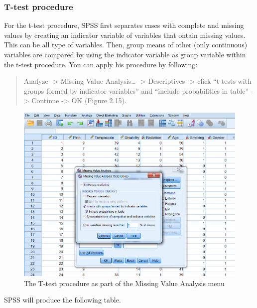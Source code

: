 \documentclass[]{book}
\begin{document}
\subsubsection{T-test procedure}\label{t-test-procedure}

For the t-test procedure, SPSS first separates cases with complete and
missing values by creating an indicator variable of variables that
ontain missing values. This can be all type of variables. Then, group
means of other (only continuous) variables are compared by using the
indicator variable as group variable within the t-test procedure. You
can apply his procedure by following:

\begin{quote}
Analyze -\textgreater{} Missing Value Analysis\ldots{} -\textgreater{}
Descriptives -\textgreater{} click ``t-tests with groups formed by
indicator variables'' and ``include probabilities in table''
-\textgreater{} Continue -\textgreater{} OK (Figure 2.15).
\end{quote}

\begin{figure}

{\centering \includegraphics[width=0.9\linewidth]{images/fig2.11} 

}

\caption{The T-test procedure as part of the Missing Value Analysis menu}\label{fig:fig2-11}
\end{figure}

SPSS will produce the following table.
\end{document}
